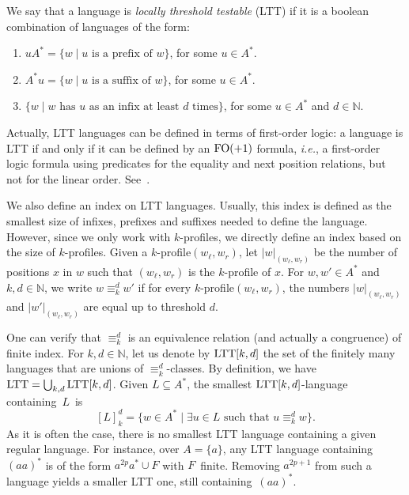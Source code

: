 \documentclass{LMCS}
\newcommand\nat{\ensuremath{\mathbb{N}}\xspace}
\newcommand{\ltt}{\textup{LTT}\xspace}
\newcommand\profile[1]{$#1$-profile\xspace}
\newcommand\profiles[1]{$#1$-profiles\xspace}
\newcommand\kprofile{\profile{k}}
\newcommand\kprofiles{\profiles{k}}
\newcommand\ltteq[2]{\ensuremath{\equiv_{#1}^{#2}}\xspace}
\newcommand\kdltteq{\ltteq{k}{d}}
\newcommand{\lttclos}[3]{\ensuremath{[#1]_{#2}^{#3}}}
\newcommand{\fos}{\ensuremath{\textup{FO}(+1)}\xspace}
\theoremstyle{plain}
\begin{document}
\medskip
{} We say that
a language is \emph{locally threshold testable} (\ltt) if it is a
boolean combination of languages of the form:

\begin{enumerate}
\item\label{p1} $uA^*=\{w \mid \text{$u$ is a prefix of $w$}\}$, for some $u \in A^{*}$.
\item\label{p2} $A^*u=\{w \mid \text{$u$ is a suffix of $w$}\}$, for some $u \in A^{*}$.
\item\label{p3} $\{w \mid \text{$w$ has $u$ as an infix at
    least $d$ times}\}$, for some $u \in A^{*}$ and $d \in \nat$.
\end{enumerate}

\medskip\noindent Actually, \ltt languages can be defined in terms
of first-order logic:  a language is \ltt if and only if it can be
defined by an \fos formula, \emph{i.e.}, a first-order logic formula
using predicates for the equality and next position relations, but not
for the linear
order. See~\cite{Beauquier&Pin:Languages-scanners:1991:a,Thomas:Classifying-regular-events-symbolic:1982:a}.

We also define an index on \ltt languages. Usually, this index is
defined as the smallest size of infixes, prefixes and suffixes needed
to define the language. However, since we only work with \kprofiles,
we directly define an index based on the size of \kprofiles. Given a
\kprofile $(w_\ell,w_r)$, let $|w|_{(w_\ell,w_r)}$ be the number of
positions $x$ in $w$ such that $(w_\ell,w_r)$ is the \kprofile of $x$.
For $w,w'\in A^*$ and $k,d\in\nat$, we write $w \kdltteq w'$
if for every \kprofile $(w_\ell,w_r)$, the numbers $|w|_{(w_\ell,w_r)}$
and $|w'|_{(w_\ell,w_r)}$ are equal up to threshold $d$. 

One can verify that $\kdltteq$ is an equivalence relation (and
actually a congruence) of finite index.  For $k,d \in \nat$, let us denote
by $\ltt[k,d]$ the set of the finitely many languages that are unions
of \kdltteq-classes. By definition,
we have $\ltt=\bigcup_{k,d}\ltt[k,d]$. Given $L\subseteq A^*$, the
smallest $\ltt[k,d]$-language containing~$L$~is
$$\lttclos{L}{k}{d}=\{w\in A^*\mid \exists u\in L\text{ such that }u\kdltteq
w\}.$$
As it is often the case, there is no
smallest \ltt language containing a given regular language.
For instance, over $A=\{a\}$, any \ltt language containing $(aa)^*$
is of the form $a^{2p}a^*\cup F$ with $F$~finite.
Removing $a^{2p+1}$ from such a language yields a smaller \ltt
one, still containing~$(aa)^*$.
\end{document}
